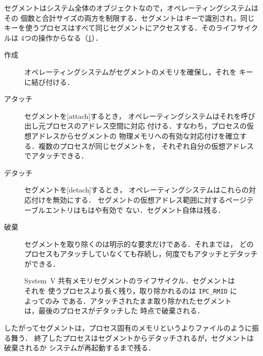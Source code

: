 \documentclass[../main.tex]{subfiles}
\begin{document}
セグメントはシステム全体のオブジェクトなので，オペレーティングシステムはその
個数と合計サイズの両方を制限する．セグメントは\emph{キー}で識別され，同じ
キーを使うプロセスはすべて同じセグメントにアクセスする．そのライフサイクルは
4つの操作からなる（\cref{fig:l09-sysv-lifecycle}）．
\begin{description}
  \item[作成] オペレーティングシステムがセグメントのメモリを確保し，それを
    キーに結び付ける．
  \item[アタッチ] セグメントを[attach]するとき，
    オペレーティングシステムはそれを呼び出し元プロセスのアドレス空間に対応
    付ける．すなわち，プロセスの仮想アドレスからセグメントの
    物理メモリへの有効な対応付けを確立する．複数のプロセスが同じセグメントを，
    それぞれ自分の仮想アドレスでアタッチできる．
  \item[デタッチ] セグメントを[detach]するとき，
    オペレーティングシステムはこれらの対応付けを無効にする．
    セグメントの仮想アドレス範囲に対するページテーブルエントリはもはや有効で
    ない．セグメント自体は残る．
  \item[破棄] セグメントを取り除くのは明示的な要求だけである．それまでは，
    どのプロセスもアタッチしていなくても存続し，何度でもアタッチとデタッチができる．
\end{description}

\begin{figure}[htbp]
  \centering
  
  \caption{System~V 共有メモリセグメントのライフサイクル．セグメントはそれを
    使うプロセスより長く残り，取り除かれるのは \texttt{IPC\_RMID} によってのみ
    である．アタッチされたまま取り除かれたセグメントは，最後のプロセスがデタッチした
    時点で破棄される．}
  \label{fig:l09-sysv-lifecycle}
\end{figure}

したがってセグメントは，プロセス固有のメモリというよりファイルのように振る舞う．
終了したプロセスはセグメントからデタッチされるが，セグメントは破棄されるか
システムが再起動するまで残る．
\end{document}
